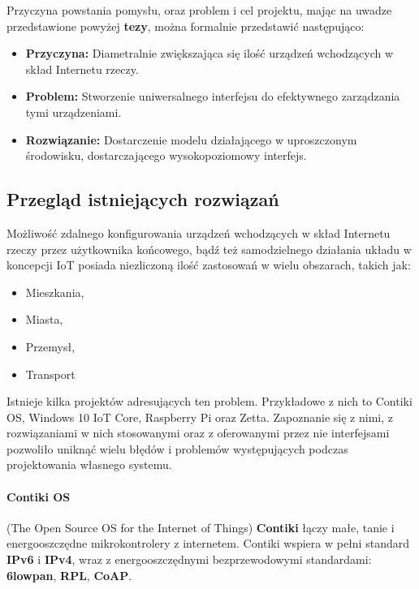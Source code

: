 Przyczyna powstania pomysłu, oraz problem i cel projektu, mając na uwadze przedstawione powyżej \textbf{tezy}, można formalnie przedstawić następująco:

\begin{itemize}
	\item \textbf{Przyczyna:} Diametralnie zwiększająca się ilość urządzeń wchodzących w skład Internetu rzeczy\cite{iot-art}.
	\item \textbf{Problem:} Stworzenie uniwersalnego interfejsu do efektywnego zarządzania tymi urządzeniami.
	\item \textbf{Rozwiązanie:} Dostarczenie modelu działającego w uproszczonym środowisku, dostarczającego wysokopoziomowy interfejs.
\end{itemize}

\subsection{Przegląd istniejących rozwiązań}
\label{sec:existing-systems}
Możliwość zdalnego konfigurowania urządzeń wchodzących w skład Internetu rzeczy przez użytkownika końcowego, bądź też samodzielnego działania układu w koncepcji IoT posiada niezliczoną ilość zastosowań w wielu obszarach, takich jak:

 \begin{itemize}
	\item Mieszkania,
	\item Miasta,
	\item Przemysł,
	\item Transport
\end{itemize}

Istnieje kilka projektów adresujących ten problem. Przykładowe z nich to Contiki OS, Windows 10 IoT Core, Raspberry Pi oraz Zetta. Zapoznanie się z nimi, z rozwiązaniami w nich stosowanymi oraz z oferowanymi przez nie interfejsami pozwoliło uniknąć wielu błędów i problemów występujących podczas projektowania własnego systemu.

\paragraph{Contiki OS}\cite{contiki-www} (The Open Source OS for the Internet of Things) \textbf{Contiki} łączy małe, tanie i energooszczędne mikrokontrolery z internetem. Contiki wspiera w pełni standard \textbf{IPv6} i \textbf{IPv4}, wraz z energooszczędnymi bezprzewodowymi standardami: \textbf{6lowpan}, \textbf{RPL}, \textbf{CoAP}. 

